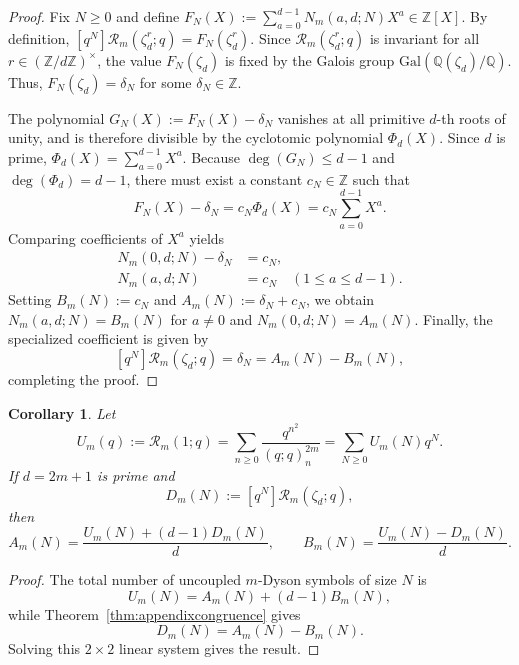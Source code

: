 \documentclass[12pt]{amsart}
\numberwithin{equation}{section}
\newtheorem{corollary}[theorem]{Corollary}
\newcommand{\RRm}{\mathcal R}
\begin{document}
\begin{proof}
Fix $N \ge 0$ and define $F_N(X) := \sum_{a=0}^{d-1} N_m(a,d;N) X^a \in \mathbb{Z}[X]$. By definition, $[q^N]\mathcal{R}_m(\zeta_d^r;q) = F_N(\zeta_d^r)$. Since $\mathcal{R}_m(\zeta_d^r;q)$ is invariant for all $r \in (\mathbb{Z}/d\mathbb{Z})^\times$, the value $F_N(\zeta_d)$ is fixed by the Galois group $\text{Gal}(\mathbb{Q}(\zeta_d)/\mathbb{Q})$. Thus, $F_N(\zeta_d) = \delta_N$ for some $\delta_N \in \mathbb{Z}$.

The polynomial $G_N(X) := F_N(X) - \delta_N$ vanishes at all primitive $d$-th roots of unity, and is therefore divisible by the cyclotomic polynomial $\Phi_d(X)$. Since $d$ is prime, $\Phi_d(X) = \sum_{a=0}^{d-1} X^a$. Because $\deg(G_N) \le d-1$ and $\deg(\Phi_d) = d-1$, there must exist a constant $c_N \in \mathbb{Z}$ such that
\[
F_N(X) - \delta_N = c_N \Phi_d(X) = c_N \sum_{a=0}^{d-1} X^a.
\]
Comparing coefficients of $X^a$ yields
\begin{align*}
N_m(0,d;N) - \delta_N &= c_N, \\
N_m(a,d;N) &= c_N \quad (1 \le a \le d-1).
\end{align*}
Setting $B_m(N) := c_N$ and $A_m(N) := \delta_N + c_N$, we obtain $N_m(a,d;N) = B_m(N)$ for $a \ne 0$ and $N_m(0,d;N) = A_m(N)$. Finally, the specialized coefficient is given by
\[
[q^N]\mathcal{R}_m(\zeta_d;q) = \delta_N = A_m(N) - B_m(N),
\]
completing the proof.
\end{proof}


\begin{corollary}\label{cor:recover}
Let
\[
U_m(q):=\RRm_m(1;q)=\sum_{n\ge 0}\frac{q^{n^2}}{(q;q)_n^{2m}}=\sum_{N\ge 0}U_m(N)q^N.
\]
If $d=2m+1$ is prime and
\[
D_m(N):=[q^N]\RRm_m(\zeta_d;q),
\]
then
\[
A_m(N)=\frac{U_m(N)+(d-1)D_m(N)}{d},
\qquad
B_m(N)=\frac{U_m(N)-D_m(N)}{d}.
\]
\end{corollary}

\begin{proof}
The total number of uncoupled $m$-Dyson symbols of size $N$ is
\[
U_m(N)=A_m(N)+(d-1)B_m(N),
\]
while Theorem~\ref{thm:appendixcongruence} gives
\[
D_m(N)=A_m(N)-B_m(N).
\]
Solving this $2\times 2$ linear system gives the result.
\end{proof}
\end{document}
